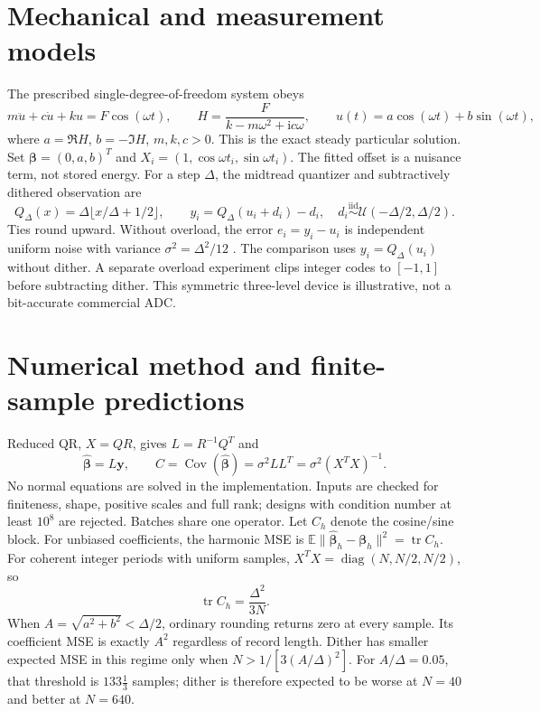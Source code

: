 \documentclass[10pt,a4paper]{article}
\begin{document}
\section{Mechanical and measurement models}
The prescribed single-degree-of-freedom system obeys
\begin{equation}
 m\ddot u+c\dot u+ku=F\cos(\omega t),\qquad
 H=\frac{F}{k-m\omega^2+\mathrm{i}c\omega},\qquad
 u(t)=a\cos(\omega t)+b\sin(\omega t),
\end{equation}
where $a=\Re H$, $b=-\Im H$, $m,k,c>0$. This is the exact steady particular
solution. Set $\boldsymbol\beta=(0,a,b)^T$ and $X_i=(1,\cos\omega t_i,
\sin\omega t_i)$. The fitted offset is a nuisance term, not stored energy.
For a step $\Delta$, the midtread quantizer and subtractively dithered observation are
\begin{equation}
 Q_\Delta(x)=\Delta\lfloor x/\Delta+1/2\rfloor,\qquad
 y_i=Q_\Delta(u_i+d_i)-d_i,\quad
 d_i\overset{\mathrm{iid}}\sim\mathcal U(-\Delta/2,\Delta/2).
\end{equation}
Ties round upward. Without overload, the error $e_i=y_i-u_i$ is independent
uniform noise with variance $\sigma^2=\Delta^2/12$ \cite{lipshitz}.
The comparison uses $y_i=Q_\Delta(u_i)$ without dither. A separate overload
experiment clips integer codes to $[-1,1]$ before subtracting dither.
This symmetric three-level device is illustrative, not a bit-accurate commercial ADC.

\clearpage
\section{Numerical method and finite-sample predictions}
Reduced QR, $X=QR$, gives $L=R^{-1}Q^T$ and
\begin{equation}
 \widehat{\boldsymbol\beta}=L\boldsymbol y,\qquad
 C=\operatorname{Cov}(\widehat{\boldsymbol\beta})
 =\sigma^2LL^T=\sigma^2(X^TX)^{-1}.
 \label{eq:cov}
\end{equation}
No normal equations are solved in the implementation. Inputs are checked for
finiteness, shape, positive scales and full rank; designs with condition number
at least $10^8$ are rejected. Batches share one operator. Let $C_h$ denote the
cosine/sine block. For unbiased coefficients, the harmonic MSE is
$\mathbb E\|\widehat{\boldsymbol\beta}_h-\boldsymbol\beta_h\|^2
=\operatorname{tr} C_h$. For coherent integer periods with uniform samples,
$X^TX=\operatorname{diag}(N,N/2,N/2)$, so
\begin{equation}
 \operatorname{tr}C_h=\frac{\Delta^2}{3N}.
 \label{eq:mse}
\end{equation}
When $A=\sqrt{a^2+b^2}<\Delta/2$, ordinary rounding returns zero at every sample.
Its coefficient MSE is exactly $A^2$ regardless of record length. Dither has
smaller expected MSE in this regime only when $N>1/[3(A/\Delta)^2]$.
For $A/\Delta=0.05$, that threshold is $133\frac13$ samples; dither is therefore
expected to be worse at $N=40$ and better at $N=640$.
\end{document}
